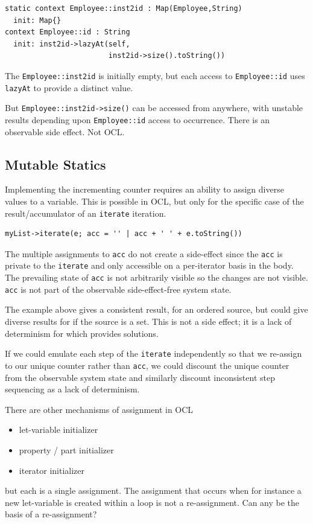 \documentclass[sigconf]{acmart}
\begin{document}
\begin{verbatim}
static context Employee::inst2id : Map(Employee,String)
  init: Map{}
context Employee::id : String
  init: inst2id->lazyAt(self,
                        inst2id->size().toString())
\end{verbatim} 

The \verb|Employee::inst2id| is initially empty, but each access to \verb|Employee::id| uses \verb|lazyAt| to provide a distinct value.

But \verb|Employee::inst2id->size()| can be accessed from anywhere, with unstable results depending upon \verb|Employee::id| access to occurrence. There is an observable side effect. Not OCL.

\subsection{Mutable Statics}\label{Mutable Statics}

Implementing the incrementing counter requires an ability to assign diverse values to a variable. This is possible in OCL, but only for the specific case of the result/accumulator of an \verb|iterate| iteration.

\begin{verbatim}
myList->iterate(e; acc = '' | acc + ' ' + e.toString())
\end{verbatim} 

The multiple assignments to \verb|acc| do not create a side-effect since the \verb|acc| is private to the \verb|iterate| and only accessible on a per-iterator basis in the body. The prevailing state of \verb|acc| is not arbitrarily visible so the changes are not visible. \verb|acc| is not part of the observable side-effect-free system state.

The example above gives a consistent result, for an ordered source, but could give diverse results for if the source is a set. This is not a side effect; it is a lack of determinism for which \cite{Willink2018} provides solutions.

If we could emulate each step of the \verb|iterate| independently so that we re-assign to our unique counter rather than \verb|acc|, we could discount the unique counter from the observable system state and similarly discount inconsistent step sequencing as a lack of determinism.

There are other mechanisms of assignment in OCL
\begin{itemize}
	\item let-variable initializer
	\item property / part initializer
	\item iterator initializer
\end{itemize}
but each is a single assignment. The assignment that occurs when for instance a new let-variable is created within a loop is not a re-assignment. Can any be the basis of a re-assignment?
\end{document}
